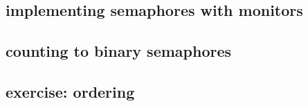  

\subsection{implementing semaphores with monitors}




\subsection{counting to binary semaphores}


\subsection{exercise: ordering}


